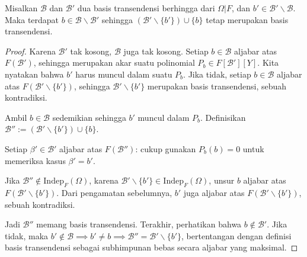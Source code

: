 \begin{lemma}\label{prop:exchange-field}
	Misalkan $\mathcal{B}$ dan $\mathcal{B}'$ dua basis transendensi berhingga dari $\Omega|F$, dan $b' \in \mathcal{B}' \smallsetminus \mathcal{B}$. Maka terdapat $b \in \mathcal{B} \smallsetminus \mathcal{B}'$ sehingga $(\mathcal{B}' \smallsetminus \{b'\}) \cup \{b\}$ tetap merupakan basis transendensi.
\end{lemma}
\begin{proof}
	Karena $\mathcal{B}'$ tak kosong, $\mathcal{B}$ juga tak kosong. Setiap $b \in \mathcal{B}$ aljabar atas $F(\mathcal{B}')$, sehingga merupakan akar suatu polinomial $P_b \in F[\mathcal{B}'][Y]$. Kita nyatakan bahwa $b'$ harus muncul dalam suatu $P_b$. Jika tidak, setiap $b \in \mathcal{B}$ aljabar atas $F(\mathcal{B}' \smallsetminus \{b'\})$, sehingga $\mathcal{B}' \smallsetminus \{b'\}$ merupakan basis transendensi, sebuah kontradiksi.
	
	Ambil $b \in \mathcal{B}$ sedemikian sehingga $b'$ muncul dalam $P_b$. Definisikan $\mathcal{B}'' := (\mathcal{B}' \smallsetminus \{b'\}) \cup \{b\}$.
	\begin{compactenum}[(a)]
		\item Setiap $\beta' \in \mathcal{B}'$ aljabar atas $F(\mathcal{B}'')$: cukup gunakan $P_b(b)=0$ untuk memeriksa kasus $\beta' = b'$.
		\item Jika $\mathcal{B}'' \notin \text{Indep}_F(\Omega)$, karena $\mathcal{B}' \smallsetminus \{b'\} \in \text{Indep}_F(\Omega)$, unsur $b$ aljabar atas $F(\mathcal{B}' \smallsetminus \{b'\})$. Dari pengamatan sebelumnya, $b'$ juga aljabar atas $F(\mathcal{B}' \smallsetminus \{b'\})$, sebuah kontradiksi.
	\end{compactenum}
	Jadi $\mathcal{B}''$ memang basis transendensi. Terakhir, perhatikan bahwa $b \notin \mathcal{B}'$. Jika tidak, maka $b' \notin \mathcal{B} \implies b' \neq b \implies \mathcal{B}'' = \mathcal{B}' \smallsetminus \{b'\}$, bertentangan dengan definisi basis transendensi sebagai subhimpunan bebas secara aljabar yang maksimal.
\end{proof}

